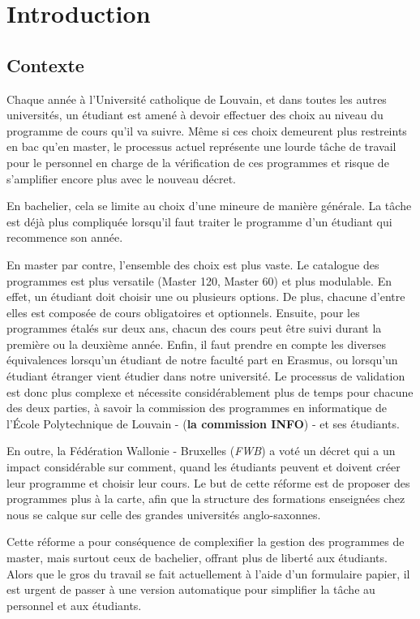 \chapter{Introduction}
\label{introduction}
\section{Contexte}

Chaque année à l'Université catholique de Louvain, et dans toutes les autres universités, un étudiant est amené à devoir effectuer des choix au niveau du programme de cours qu'il va suivre. Même si ces choix demeurent plus restreints en bac qu'en master, le processus actuel représente une lourde tâche de travail pour le personnel en charge de la vérification de ces programmes et risque de s'amplifier encore plus avec le nouveau décret. 

En bachelier, cela se limite au choix d'une mineure de manière générale. La tâche est déjà plus compliquée lorsqu'il faut traiter le programme d'un étudiant qui recommence son année.

En master par contre, l'ensemble des choix est plus vaste. Le catalogue des programmes est plus versatile (Master 120, Master 60) et plus modulable. En effet, un étudiant doit choisir une ou plusieurs options. De plus, chacune d'entre elles est composée de cours obligatoires et optionnels. Ensuite, pour les programmes étalés sur deux ans, chacun des cours peut être suivi durant la première ou la deuxième année. Enfin, il faut prendre en compte les diverses équivalences lorsqu'un étudiant de notre faculté part en Erasmus, ou lorsqu'un étudiant étranger vient étudier dans notre université. Le processus de validation est donc plus complexe et nécessite considérablement plus de temps pour chacune des deux parties, à savoir la commission des programmes en informatique de l'École Polytechnique de Louvain - (\textbf{la commission INFO}) - et ses étudiants. 

En outre, la Fédération Wallonie - Bruxelles (\textit{FWB}) a voté un décret qui a un impact considérable sur comment, quand les étudiants  peuvent et doivent créer leur programme et choisir leur cours. Le but de cette réforme est de proposer des programmes plus à la carte,  afin que la structure des formations enseignées chez nous se calque sur celle des grandes universités anglo-saxonnes.

Cette réforme a pour conséquence de complexifier la gestion des programmes de master, mais surtout ceux de bachelier, offrant plus de liberté aux étudiants. Alors que le gros du travail se fait actuellement à l'aide d'un formulaire papier, il est urgent de passer à une version automatique pour simplifier la tâche au personnel et aux étudiants. 

